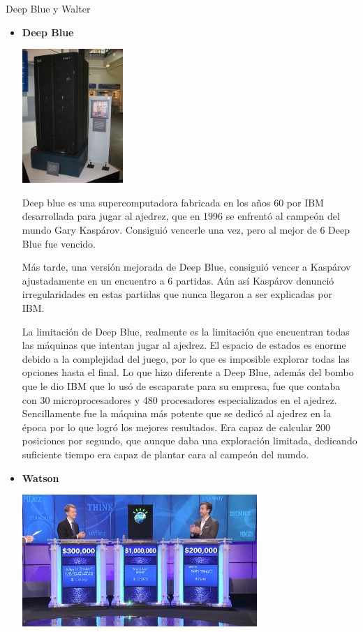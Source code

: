 \documentclass[spanish, a4paper, 12pt]{article} 	%
\begin{document}
\begin{section}{Deep Blue y Walter}
	\begin{itemize}
		\item{\textbf{Deep Blue}}
		
		\begin{center}
		\includegraphics[width=0.3\textwidth]{deepBlue.png}
		\end{center}
		
		 Deep blue es una supercomputadora fabricada en los años 60 por IBM desarrollada para jugar al ajedrez, que en 1996 se enfrentó al campeón del mundo Gary Kaspárov. Consiguió vencerle una vez, pero al mejor de 6 Deep Blue fue vencido.
	
		Más tarde, una versión mejorada de Deep Blue, consiguió vencer a Kaspárov ajustadamente en un encuentro a 6 partidas. Aún así Kaspárov denunció irregularidades en estas partidas que nunca llegaron a ser explicadas por IBM. 

		La limitación de Deep Blue, realmente es la limitación que encuentran todas las máquinas que intentan jugar al ajedrez. El espacio de estados es enorme debido a la complejidad del juego, por lo que es imposible explorar todas las opciones hasta el final. Lo que hizo diferente a Deep Blue, además del bombo que le dio IBM que lo usó de escaparate para su empresa, fue que contaba con 30  microprocesadores y 480 procesadores especializados en el ajedrez. Sencillamente fue la máquina más potente que se dedicó al ajedrez en la época por lo que logró los mejores resultados. Era capaz de calcular 200 posiciones por segundo, que aunque daba una exploración limitada, dedicando suficiente tiempo era capaz de plantar cara al campeón del mundo.
	
	\newpage
	\item{\textbf{Watson}}
	
		\begin{center}
		\includegraphics[width=0.7\textwidth]{Watson.png}
		\end{center}
	

\end{itemize}
\end{section}
\end{document}
